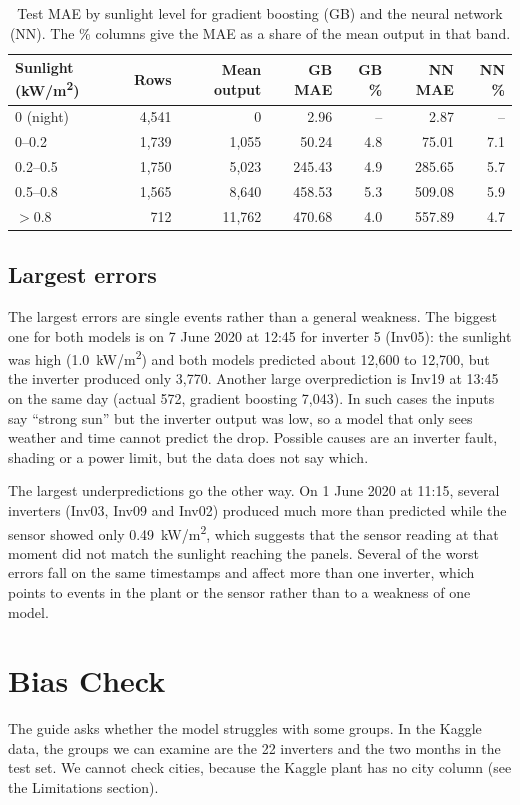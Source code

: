\begin{table}[H]
\centering
\small
\begin{tabular}{lrrrrrr}
\toprule
\textbf{Sunlight (kW/m\textsuperscript{2})} & \textbf{Rows} & \textbf{Mean output} & \textbf{GB MAE} & \textbf{GB \%} & \textbf{NN MAE} & \textbf{NN \%} \\
\midrule
0 (night) & 4,541 & 0 & 2.96 & -- & 2.87 & -- \\
0--0.2 & 1,739 & 1,055 & 50.24 & 4.8 & 75.01 & 7.1 \\
0.2--0.5 & 1,750 & 5,023 & 245.43 & 4.9 & 285.65 & 5.7 \\
0.5--0.8 & 1,565 & 8,640 & 458.53 & 5.3 & 509.08 & 5.9 \\
$>0.8$ & 712 & 11,762 & 470.68 & 4.0 & 557.89 & 4.7 \\
\bottomrule
\end{tabular}
\caption{Test MAE by sunlight level for gradient boosting (GB) and the neural network (NN). The \% columns give the MAE as a share of the mean output in that band.}
\label{tab:irr}
\end{table}

\subsection{Largest errors}
The largest errors are single events rather than a general weakness. The biggest one for both models is on 7 June 2020 at 12:45 for inverter 5 (Inv05): the sunlight was high (1.0~kW/m\textsuperscript{2}) and both models predicted about 12,600 to 12,700, but the inverter produced only 3,770. Another large overprediction is Inv19 at 13:45 on the same day (actual 572, gradient boosting 7,043). In such cases the inputs say ``strong sun'' but the inverter output was low, so a model that only sees weather and time cannot predict the drop. Possible causes are an inverter fault, shading or a power limit, but the data does not say which.

The largest underpredictions go the other way. On 1 June 2020 at 11:15, several inverters (Inv03, Inv09 and Inv02) produced much more than predicted while the sensor showed only 0.49~kW/m\textsuperscript{2}, which suggests that the sensor reading at that moment did not match the sunlight reaching the panels. Several of the worst errors fall on the same timestamps and affect more than one inverter, which points to events in the plant or the sensor rather than to a weakness of one model.

\section{Bias Check}
The guide asks whether the model struggles with some groups. In the Kaggle data, the groups we can examine are the 22 inverters and the two months in the test set. We cannot check cities, because the Kaggle plant has no city column (see the Limitations section).

